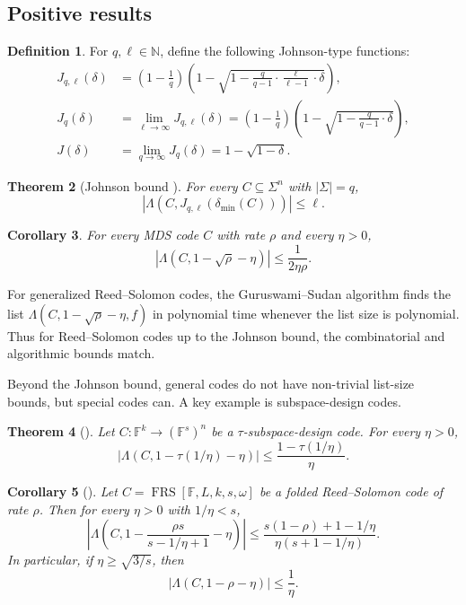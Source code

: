\documentclass[11pt]{article}
\theoremstyle{plain}
\newtheorem{theorem}{Theorem}[section]
\newtheorem{corollary}[theorem]{Corollary}
\theoremstyle{definition}
\newtheorem{definition}[theorem]{Definition}
\newcommand{\F}{\mathbb{F}}
\newcommand{\N}{\mathbb{N}}
\newcommand{\FRS}[5]{\operatorname{FRS}[#1,#2,#3,#4,#5]}
\newcommand{\distmin}{\delta_{\min}}
\newcommand{\abs}[1]{\left|#1\right|}
\begin{document}
\subsection{Positive results}

\begin{definition}
For $q,\ell\in\N$, define the following Johnson-type functions:
\begin{align*}
J_{q,\ell}(\delta)
&=\left(1-\frac1q\right)
  \left(1-\sqrt{1-\frac{q}{q-1}\cdot\frac{\ell}{\ell-1}\cdot\delta}\right),\\
J_q(\delta)&=\lim_{\ell\to\infty}J_{q,\ell}(\delta)
=\left(1-\frac1q\right)
  \left(1-\sqrt{1-\frac{q}{q-1}\cdot\delta}\right),\\
J(\delta)&=\lim_{q\to\infty}J_q(\delta)=1-\sqrt{1-\delta}.
\end{align*}
\end{definition}

\begin{theorem}[Johnson bound \cite{Joh62}]
For every $C\subseteq\Sigma^n$ with $\abs{\Sigma}=q$,
\[
  \abs{\Lambda(C,J_{q,\ell}(\distmin(C)))}\le \ell.
\]
\end{theorem}

\begin{corollary}
For every MDS code $C$ with rate $\rho$ and every $\eta>0$,
\[
  \abs{\Lambda(C,1-\sqrt{\rho}-\eta)}\le \frac{1}{2\eta\rho}.
\]
\end{corollary}

For generalized Reed--Solomon codes, the Guruswami--Sudan algorithm \cite{GS99} finds the list $\Lambda(C,1-\sqrt\rho-\eta,f)$ in polynomial time whenever the list size is polynomial. Thus for Reed--Solomon codes up to the Johnson bound, the combinatorial and algorithmic bounds match.

Beyond the Johnson bound, general codes do not have non-trivial list-size bounds, but special codes can. A key example is subspace-design codes.

\begin{theorem}[\cite{CZ25}]
Let $C:\F^k\to(\F^s)^n$ be a $\tau$-subspace-design code. For every $\eta>0$,
\[
  \abs{\Lambda(C,1-\tau(1/\eta)-\eta)}\le \frac{1-\tau(1/\eta)}{\eta}.
\]
\end{theorem}

\begin{corollary}[\cite{CZ25}]
Let $C=\FRS{\F}{L}{k}{s}{\omega}$ be a folded Reed--Solomon code of rate $\rho$. Then for every $\eta>0$ with $1/\eta<s$,
\[
\left|\Lambda\left(C,1-\frac{\rho s}{s-1/\eta+1}-\eta\right)\right|
\le
\frac{s(1-\rho)+1-1/\eta}{\eta(s+1-1/\eta)}.
\]
In particular, if $\eta\ge\sqrt{3/s}$, then
\[
  \abs{\Lambda(C,1-\rho-\eta)}\le \frac1\eta.
\]
\end{corollary}
\end{document}
